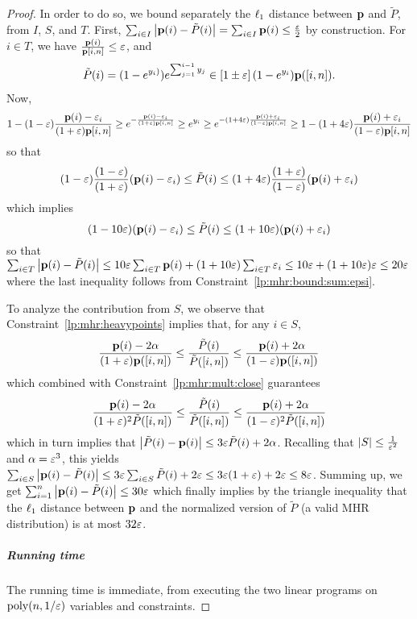 \begin{proof}
In order to do so, we bound separately the $\lp[1]$ distance between $\D$ and $\tilde{P}$, from $I$, $S$, and $T$. 
First, $\sum_{i\in I} \abs{\D(i) - \tilde{P}(i)}  = \sum_{i\in I} \D(i) \leq \frac{\eps}{2}$ by construction.
For $i\in T$, we have $\frac{\D(i)}{\D[i,n]} \leq \eps$, and
\begin{align*}
  \tilde{P}(i) = (1-e^{y_i)}) e^{\sum_{j=1}^{i-1} y_j} \in \left[1\pm \eps\right] (1-e^{y_i}) \D([i,n]).
\end{align*}
Now,
\begin{align*}
  1-(1-\eps)\frac{\D(i)-\eps_i}{(1+\eps)\D[i,n]} \geq e^{-\frac{\D(i)-\eps_i}{(1+\eps)\D[i,n]}} 
  \geq e^{y_i} 
  \geq e^{-(1+4\eps)\frac{\D(i)+\eps_i}{(1-\eps)\D[i,n]}} 
  \geq 1-(1+4\eps)\frac{\D(i)+\eps_i}{(1-\eps)\D[i,n]}
\end{align*}
so that
\[
  (1-\eps)\frac{(1-\eps)}{(1+\eps)}(\D(i)-\eps_i)
  \leq
  \tilde{P}(i) 
  \leq
  (1+4\eps)\frac{(1+\eps)}{(1-\eps)}(\D(i)+\eps_i)
\]
which implies
\[
  (1-10\eps)(\D(i)-\eps_i)
  \leq
  \tilde{P}(i) 
  \leq
  (1+10\eps)(\D(i)+\eps_i)
\]
so that $\sum_{i\in T} \abs{\D(i) - \tilde{P}(i)} \leq 10\eps \sum_{i\in T} \D(i) + (1+10\eps)\sum_{i\in T} \eps_i \leq 10\eps + (1+10\eps)\eps \leq 20\eps$
where the last inequality follows from Constraint~\eqref{lp:mhr:bound:sum:epsi}.

To analyze the contribution from $S$, we observe that Constraint~\eqref{lp:mhr:heavypoints} implies that, for any $i\in S$,
\[
    \frac{\D(i)-2\alpha}{(1+\eps)\D([i,n])} \leq \frac{\tilde{P}(i)}{\tilde{P}([i,n])} \leq \frac{\D(i)+2\alpha}{(1-\eps)\D([i,n])}
\]
which combined with Constraint~\eqref{lp:mhr:mult:close} guarantees
\[
    \frac{\D(i)-2\alpha}{(1+\eps)^2\tilde{P}([i,n])} \leq \frac{\tilde{P}(i)}{\tilde{P}([i,n])} \leq \frac{\D(i)+2\alpha}{(1-\eps)^2\tilde{P}([i,n])}
\]
which in turn implies that $\abs{\tilde{P}(i) - \D(i) } \leq 3\eps\tilde{P}(i) + 2\alpha$. Recalling that $\abs{S} \leq \frac{1}{\eps^2}$ and $\alpha=\eps^3$, this yields
$\sum_{i\in S} \abs{\D(i) - \tilde{P}(i)} \leq 3\eps \sum_{i\in S}  \tilde{P}(i)  + 2\eps \leq 3\eps(1+\eps) + 2\eps \leq 8\eps$. Summing up, we get
$
  \sum_{i=1}^n \abs{\D(i) - \tilde{P}(i)} \leq 30\eps
$
which finally implies by the triangle inequality that the $\lp[1]$ distance between $\D$ and the normalized version of $\tilde{P}$ (a valid MHR distribution) is at most $32\eps$.

\subparagraph{Running time} The running time is immediate, from executing the two linear programs on $\poly(n,1/\eps)$ variables and constraints.
\end{proof}


